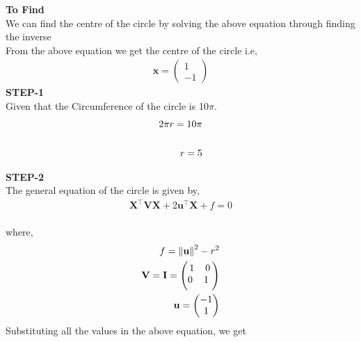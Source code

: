 \documentclass[10pt,a4paper]{report}
\newcommand{\myvec}[1]{\ensuremath{\begin{pmatrix}#1\end{pmatrix}}}
\let\vec\mathbf
\providecommand{\norm}[1]{\left\lVert#1\right\rVert}
\let\vec\mathbf
\begin{document}
\begin{multicols}{2}
\textbf{To Find }\vspace{2mm}\\
We can find the centre of the circle by solving the above equation through finding the inverse \vspace{2mm}  \\ 
From the above equation we get the centre of the circle i.e, \\\vspace{1mm}
\begin{align}
    \vec{x} =
    \myvec{
    1\\
    -1
    }
\end{align}
\textbf{STEP-1}\vspace{2mm}\\
Given that the Circumference of the circle is 10$\pi$. \\ \vspace{1mm}
\begin{align}
    2\pi{r} = 10\pi
    \\ \vspace{1mm}
    \\
    {r} = 5
\end{align}

\textbf{STEP-2}\vspace{2mm}\\
The general equation of the circle is given by,\\ \vspace{1mm}
\begin{align}
    \textbf{X}^\top \textbf{V}\textbf{X}+2\textbf{u}^\top\textbf{X}+{f} = 0
\end{align}
\\
where, \\ \vspace{1mm}
\begin{align}
    f = \vec{\norm{u}}^2-{r}^2\\
    \vec{V}=\vec{I}=\myvec{
    1 \hspace{4mm} 0 \\ \vspace{1mm}
    0 \hspace{4mm} 1 \
    }
    \\ \vspace{1mm}
    \textbf{u}=\myvec{
    {-1}
    \\
    {1}
    }
\end{align}
Substituting all the values in the above equation, we get \\


\end{multicols}
\end{document}

